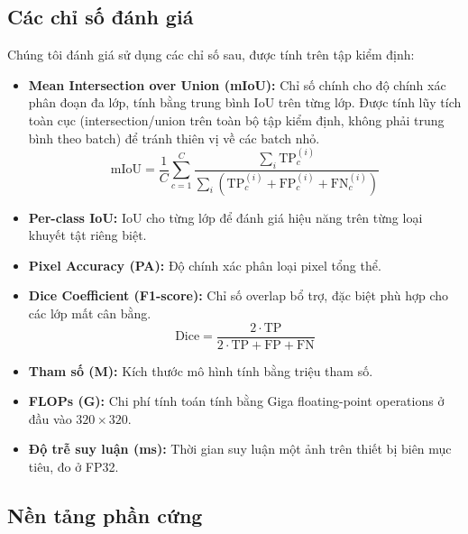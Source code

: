 \documentclass[conference]{IEEEtran}
\begin{document}
\subsection{Các chỉ số đánh giá}

Chúng tôi đánh giá sử dụng các chỉ số sau, được tính trên tập kiểm định:

\begin{itemize}
    \item \textbf{Mean Intersection over Union (mIoU):} Chỉ số chính cho độ chính xác phân đoạn đa lớp, tính bằng trung bình IoU trên từng lớp. Được tính lũy tích toàn cục (intersection/union trên toàn bộ tập kiểm định, không phải trung bình theo batch) để tránh thiên vị về các batch nhỏ.
    \begin{equation}
    \text{mIoU} = \frac{1}{C} \sum_{c=1}^{C} \frac{\sum_i \text{TP}_c^{(i)}}{\sum_i (\text{TP}_c^{(i)} + \text{FP}_c^{(i)} + \text{FN}_c^{(i)})}
    \end{equation}

    \item \textbf{Per-class IoU:} IoU cho từng lớp để đánh giá hiệu năng trên từng loại khuyết tật riêng biệt.

    \item \textbf{Pixel Accuracy (PA):} Độ chính xác phân loại pixel tổng thể.

    \item \textbf{Dice Coefficient (F1-score):} Chỉ số overlap bổ trợ, đặc biệt phù hợp cho các lớp mất cân bằng.
    \begin{equation}
    \text{Dice} = \frac{2 \cdot \text{TP}}{2 \cdot \text{TP} + \text{FP} + \text{FN}}
    \end{equation}

    \item \textbf{Tham số (M):} Kích thước mô hình tính bằng triệu tham số.

    \item \textbf{FLOPs (G):} Chi phí tính toán tính bằng Giga floating-point operations ở đầu vào $320 \times 320$.

    \item \textbf{Độ trễ suy luận (ms):} Thời gian suy luận một ảnh trên thiết bị biên mục tiêu, đo ở FP32.
\end{itemize}

\subsection{Nền tảng phần cứng}
\end{document}
